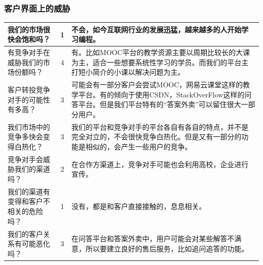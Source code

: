 \documentclass[a4paper]{ctexart}
\begin{document}
\subsubsection{客户界面上的威胁}
\begin{table}[h]
  \centering
\begin{tabular}{|p{3.5cm}|c|p{10cm}|}
  \hline
  我们的市场很快会饱和吗？& 1 & 不会，如今互联网行业的发展迅猛，越来越多的人开始学习编程。\\
  \hline
  有竞争对手在威胁我们的市场份额吗？& 4 & 有。比如MOOC平台的教学资源主要以周期比较长的大课为主，适合一些想要系统性学习的学员。而我们的平台主打短小简介的小课以解决问题为主。\\
  \hline
  客户转投竞争对手的可能性有多高？& 3 & 可能会有一部分客户会尝试MOOC，网易云课堂这样的教学平台。有的倾向于使用CSDN，StackOverFlow这样的问答平台。但是我们平台特有的“答案外卖”可以留住很大一部分用户。\\
  \hline
  我们市场中的竞争多快会变得白热化？& 3 & 我们的平台和竞争对手的平台各自有各自的特点，并不是完全对立的，不会很快竞争白热化。但是又有一部分的功能是相似的，会产生一些用户的竞争。\\
  \hline
  竞争对手会威胁我们的渠道吗？& 2 & 在合作方渠道上，竞争对手可能也会利用高校，企业进行宣传。\\
  \hline
  我们的渠道有变得和客户不相关的危险吗？& 1 & 没有，都是和客户直接接触的，息息相关。\\
  \hline
  我们的客户关系有可能恶化吗？& 3 & 在问答平台和答案外卖中，用户可能会对某些解答不满意，所以要建立良好的售后服务，比如追问追答的功能。\\
  \hline
\end{tabular}
\end{table}




\end{document}
